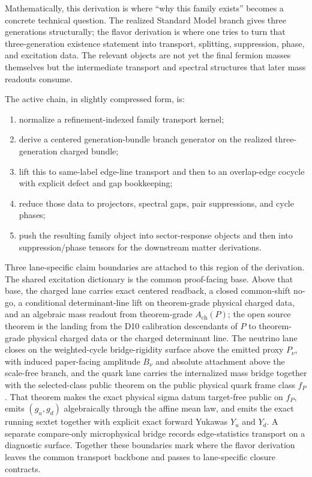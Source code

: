 \documentclass[11pt]{article}
\begin{document}
Mathematically, this derivation is where ``why this family exists'' becomes a concrete technical
question. The realized Standard Model branch gives three generations structurally; the flavor
derivation is where one tries to turn that three-generation existence statement into transport,
splitting, suppression, phase, and excitation data. The relevant objects are not yet the final
fermion masses themselves but the intermediate transport and spectral structures that later mass
readouts consume.

The active chain, in slightly compressed form, is:
\begin{enumerate}[leftmargin=2em]
\item normalize a refinement-indexed family transport kernel;
\item derive a centered generation-bundle branch generator on the realized three-generation
charged bundle;
\item lift this to same-label edge-line transport and then to an overlap-edge cocycle with
explicit defect and gap bookkeeping;
\item reduce those data to projectors, spectral gaps, pair suppressions, and cycle phases;
\item push the resulting family object into sector-response objects and then into
suppression/phase tensors for the downstream matter derivations.
\end{enumerate}

Three lane-specific claim boundaries are attached to this region of the derivation. The shared
excitation dictionary is the common proof-facing base. Above that base, the charged lane carries
exact centered readback, a closed common-shift no-go, a conditional determinant-line lift on
theorem-grade physical charged data, and an algebraic mass readout from theorem-grade
\(A_{\mathrm{ch}}(P)\); the open source theorem is the landing from the D10 calibration
descendants of \(P\) to theorem-grade physical charged data or the charged determinant line. The neutrino lane closes on the weighted-cycle
bridge-rigidity surface above the emitted proxy \(P_\nu\), with induced paper-facing amplitude \(B_\nu\) and absolute attachment above the scale-free branch, and the quark
lane carries the internalized mass bridge together with the selected-class public theorem on the
public physical quark frame class \(f_P\). That theorem makes the exact physical sigma datum
target-free public on \(f_P\), emits \((g_u,g_d)\) algebraically through the affine mean law,
and emits the exact running sextet together with explicit exact forward Yukawas \(Y_u\) and
\(Y_d\). A separate compare-only microphysical bridge records edge-statistics transport on a
diagnostic surface. Together these boundaries mark where the flavor
derivation leaves the common transport backbone and passes to lane-specific closure contracts.
\end{document}
